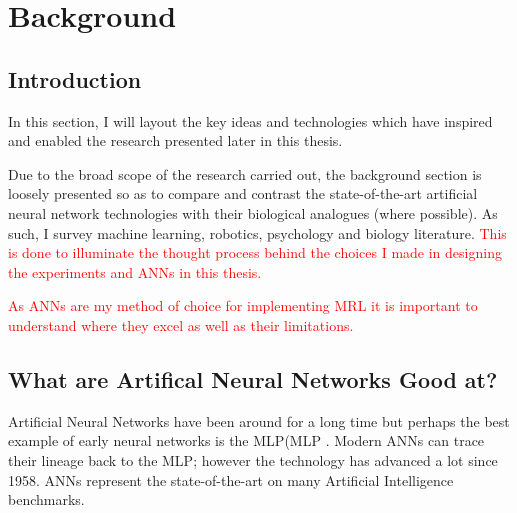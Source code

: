 
\chapter{Background} %

\label{Chapter3} %



\section{Introduction}\label{Lit:Intro}
In this section, I will layout the key ideas and technologies which have inspired and enabled the research presented later in this thesis.

Due to the broad scope of the research carried out, the background section is loosely presented so as to compare and contrast the state-of-the-art artificial neural network technologies with their biological analogues (where possible). As such, I survey machine learning, robotics, psychology and biology literature. \textcolor{red}{This is done to illuminate the thought process behind the choices I made in designing the experiments and \acp{ANN} in this thesis.}


\textcolor{red}{As \acp{ANN} are my method of choice for implementing \ac{MRL} it is important to understand where they excel as well as their limitations.}

\section{What are Artifical Neural Networks Good at?}

Artificial Neural Networks have been around for a long time but perhaps the best example of early neural networks is the \acl{MLP}(\ac{MLP} \cite{rosenblatt1958perceptron}. Modern \acp{ANN} can trace their lineage back to the \ac{MLP}; however the technology has advanced a lot since 1958. \acp{ANN} represent the state-of-the-art on many Artificial Intelligence benchmarks.


